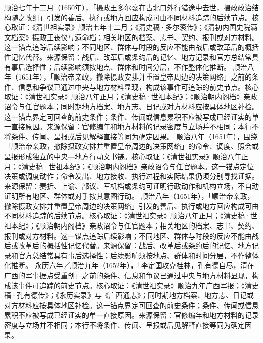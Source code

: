 顺治七年十二月（1650年），「摄政王多尔衮在古北口外行猎途中去世，摄政政治结构随之改组」引发的善后、执行或地方回应构成可由不同材料追踪的后续节点。核心取证：《清世祖实录》顺治七年十二月；《清史稿·多尔衮传》；《清初内国史院满文档案》摄政王丧仪与遗命档；相关地区的档案、志书、契约、报刊或对方材料。这一锚点追踪后续影响；不同地区、群体与时段的反应不能由战后或改革后的概括性记忆代替。来源保留：战后、改革后或条约后的记忆、地方记录和官方总结常具有事后选择性；后续影响须按地点、群体和时间分层，不作整体化推断。
顺治八年（1651年），「顺治帝亲政，撤除摄政安排并重置皇帝周边的决策网络」之前的条件、信息和争议已通过中央与地方材料显现，构成该事件可追踪的前史节点。核心取证：《清世祖实录》顺治八年正月；《清史稿·世祖本纪》；《顺治朝内阁档》亲政诏令与任官题本；同时期地方档案、地方志、日记或对方材料应按具体地区补检。这一锚点界定可回查的前史条件；条件、传闻或信息累积不应被写成已经证实的单一直接原因。来源保留：官修编年和地方材料的记录密度与立场并不相同；本行不将条件、传闻、呈报或后见解释直接等同为确定因果。
顺治八年（1651年），围绕「顺治帝亲政，撤除摄政安排并重置皇帝周边的决策网络」的命令、调度、照会或呈报形成独立的中央—地方行动文书链。核心取证：《清世祖实录》顺治八年正月；《清史稿·世祖本纪》；《顺治朝内阁档》亲政诏令与任官题本。这一锚点定位决策或调度动作；命令发出、地方接收、执行过程和实际结果仍须分别寻找证据。来源保留：奏折、上谕、部议、军机档或条约可证明行政动作和机构立场，不自动证明所有地区、群体或对手按其意图行动。
顺治八年（1651年），「顺治帝亲政，撤除摄政安排并重置皇帝周边的决策网络」引发的善后、执行或地方回应构成可由不同材料追踪的后续节点。核心取证：《清世祖实录》顺治八年正月；《清史稿·世祖本纪》；《顺治朝内阁档》亲政诏令与任官题本；相关地区的档案、志书、契约、报刊或对方材料。这一锚点追踪后续影响；不同地区、群体与时段的反应不能由战后或改革后的概括性记忆代替。来源保留：战后、改革后或条约后的记忆、地方记录和官方总结常具有事后选择性；后续影响须按地点、群体和时间分层，不作整体化推断。
永历六年／顺治九年（1652年），「李定国攻克桂林，孔有德自尽，清在广西的军事据点受重创」之前的条件、信息和争议已通过中央与地方材料显现，构成该事件可追踪的前史节点。核心取证：《清世祖实录》顺治九年广西军报；《清史稿·孔有德传》；《永历实录》与《广西通志》；同时期地方档案、地方志、日记或对方材料应按具体地区补检。这一锚点界定可回查的前史条件；条件、传闻或信息累积不应被写成已经证实的单一直接原因。来源保留：官修编年和地方材料的记录密度与立场并不相同；本行不将条件、传闻、呈报或后见解释直接等同为确定因果。
